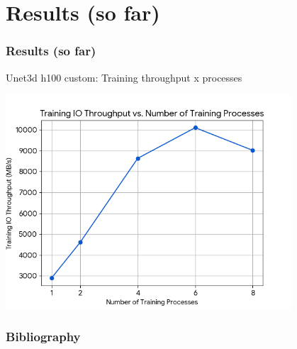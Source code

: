 \documentclass[brazil, bsc, 10pt]{beamer}
\begin{document}
\section{Results (so far)}

\begin{frame}
	\frametitle{Results (so far)}
	\begin{block}{Unet3d h100 custom: Training throughput x processes}

		\includegraphics[width=0.8\textwidth]{./images/training_io.png}
	\end{block}
\end{frame}


\begin{frame}[allowframebreaks]
	\frametitle{Bibliography}
	
\end{frame}
\end{document}
